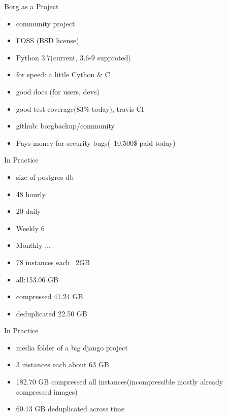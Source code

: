\documentclass{beamer}
\begin{document}
\begin{frame}{Borg as a Project}
	\begin{itemize}
		
	\item community project
	
	\item FOSS  (BSD license)
	
	\item Python 3.7(current, 3.6-9 supproted)
	
	\item for speed:  a little Cython \& C
	
	\item good docs  (for users, devs)
	
	\item good test coverage(83\% today), travis CI
	
	\item github: borgbackup/community
	\item Pays money for security bugs(~10,500\$ paid today)  
\end{itemize}
\end{frame}

\begin{frame}{In Practice}
	\begin{itemize}
		\item size of postgres db 
		\item 48 hourly
		\item 20 daily 
		\item Weekly 6
		\item Monthly ...
		\item 78 instances  each ~2GB
		\item all:153.06 GB
		\item compressed 41.24 GB
		\item deduplicated 22.50 GB
	\end{itemize}
\end{frame}
\begin{frame}{In Practice}
\begin{itemize}
	\item media folder of a big django project 
	\item 3 instances each about 63 GB
	\item 182.70 GB compressed all instances(incompressible mostly already compressed images)
	\item 60.13 GB deduplicated across time
\end{itemize}
\end{frame}
\end{document}
